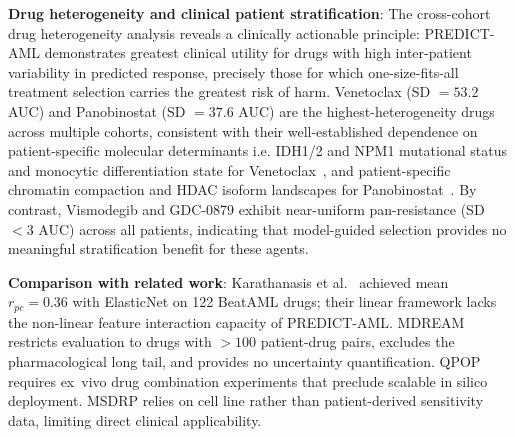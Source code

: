 \documentclass[pdflatex,sn-mathphys-num]{sn-jnl}
\theoremstyle{thmstyleone}
\theoremstyle{thmstyletwo}
\theoremstyle{thmstylethree}
\begin{document}
\textbf{Drug heterogeneity and clinical patient stratification}: The cross-cohort drug heterogeneity analysis reveals a clinically actionable principle: PREDICT-AML demonstrates greatest clinical utility for drugs with high inter-patient variability in predicted response, precisely those for which one-size-fits-all treatment selection carries the greatest risk of harm. Venetoclax (SD $= 53.2$ AUC) and Panobinostat (SD $= 37.6$ AUC) are the highest-heterogeneity drugs across multiple cohorts, consistent with their well-established dependence on patient-specific molecular determinants i.e. IDH1/2 and NPM1 mutational status and monocytic differentiation state for Venetoclax~\cite{bisaillon2020genetic, zhang2020integrated, allen2025venetoclax}, and patient-specific chromatin compaction and HDAC isoform landscapes for Panobinostat~\cite{tang2025epigenetic, kuhn2025epigenetic}. By contrast, Vismodegib and GDC-0879 exhibit near-uniform pan-resistance (SD $< 3$ AUC) across all patients, indicating that model-guided selection provides no meaningful stratification benefit for these agents. %


\textbf{Comparison with related work}: Karathanasis et al.\ \cite{karathanasis2024machine} achieved mean $r_{pc} = 0.36$ with ElasticNet on 122 BeatAML drugs; their linear framework lacks the non-linear feature interaction capacity of PREDICT-AML. MDREAM \cite{trac2023prediction} restricts evaluation to drugs with $>100$ patient-drug pairs, excludes the pharmacological long tail, and provides no uncertainty quantification. QPOP \cite{sahib2024combinatorial} requires ex~vivo drug combination experiments that preclude scalable in silico deployment. MSDRP \cite{zhao2023msdrp} relies on cell line rather than patient-derived sensitivity data, limiting direct clinical applicability.
\end{document}
